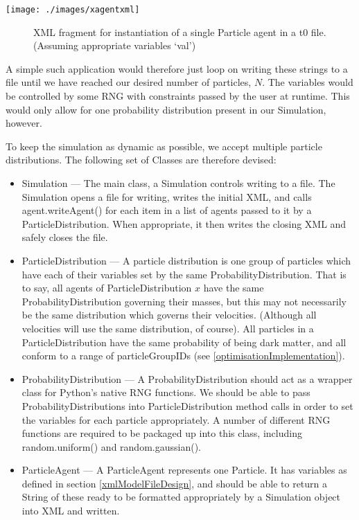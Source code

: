 \documentclass[11pt,a4paper]{article}
\begin{document}
\texttt{[image: ./images/xagentxml]}
\begin{figure}[h!]
\caption[Single Particle agent XML]{XML fragment for instantiation of a single Particle agent in a t0 file. (Assuming appropriate variables `val')}
\end{figure}

\noindent A simple such application would therefore just loop on writing these strings to a file until we have reached our desired number of particles, $N$. The variables would be controlled by some RNG with constraints passed by the user at runtime. This would only allow for one probability distribution present in our Simulation, however. 

To keep the simulation as dynamic as possible, we accept multiple particle distributions. The following set of Classes are therefore devised:
\begin{itemize}
\item Simulation --- The main class, a Simulation controls writing to a file. The Simulation opens a file for writing, writes the initial XML, and calls agent.writeAgent() for each item in a list of agents passed to it by a ParticleDistribution. When appropriate, it then writes the closing XML and safely closes the file.
\item ParticleDistribution --- A particle distribution is one group of particles which have each of their variables set by the same ProbabilityDistribution. That is to say, all agents of ParticleDistribution $x$ have the same ProbabilityDistribution governing their masses, but this may not necessarily be the same distribution which governs their velocities. (Although all velocities will use the same distribution, of course). All particles in a ParticleDistribution have the same probability of being dark matter, and all conform to a range of particleGroupIDs (see \ref{optimisationImplementation}).
\item ProbabilityDistribution --- A ProbabilityDistribution should act as a wrapper class for Python's native RNG functions. We should be able to pass ProbabilityDistributions into ParticleDistribution method calls in order to set the variables for each particle appropriately. A number of different RNG functions are required to be packaged up into this class, including random.uniform() and random.gaussian().
\item ParticleAgent --- A ParticleAgent represents one Particle. It has variables as defined in section \ref{xmlModelFileDesign}, and should be able to return a String of these ready to be formatted appropriately by a Simulation object into XML and written.
\end{itemize}
\end{document}
